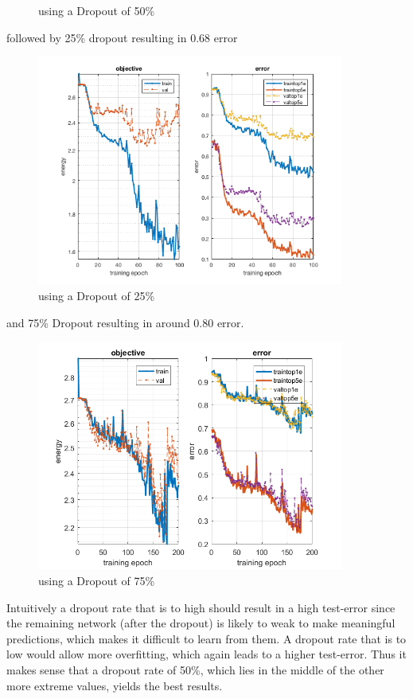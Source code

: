 \documentclass[12pt]{article}
\begin{document}
\begin{enumerate}[a)]
\begin{figure}[H]
                \caption{using a Dropout of 50\%}
        \end{figure}
        followed by 25\% dropout resulting in 0.68 error 
        \begin{figure}[H]
            \centering
                \includegraphics[width=0.9\textwidth]{Plots/3_25_200.png}
                \caption{using a Dropout of 25\%}
        \end{figure}
        and 75\% Dropout resulting in around 0.80 error.
        \begin{figure}[H]
            \centering
                \includegraphics[width=0.9\textwidth]{Plots/3_75_200.png}
                \caption{using a Dropout of 75\%}
        \end{figure}
        Intuitively a dropout rate that is to high should result in a high test-error since the remaining network (after the dropout) is likely to weak to make meaningful predictions, which makes it difficult to learn from them. A dropout rate that is to low would allow more overfitting, which again leads to a higher test-error. Thus it makes sense that a dropout rate of 50\%, which lies in the middle of the other more extreme values, yields the best results.
\end{enumerate}
\end{document}
